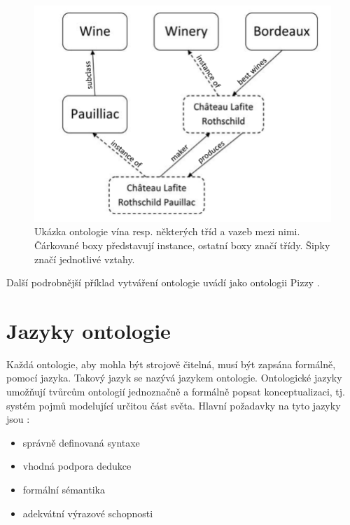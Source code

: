 \begin{figure}[h]
\begin{center}
\includegraphics{figures/wine}
\caption{Ukázka ontologie vína resp. některých tříd a vazeb mezi nimi. Čárkované boxy představují instance, ostatní boxy značí třídy. Šipky značí jednotlivé vztahy.}
\label{img:wine}
\end{center}
\end{figure}

Další podrobnější příklad vytváření ontologie uvádí \cite{owltutorial} jako ontologii Pizzy \cite{pizza}.

\section{Jazyky ontologie}
\label{chapter:ontologyLanguage}

Každá ontologie, aby mohla být strojově čitelná, musí být zapsána formálně, pomocí jazyka. Takový jazyk se nazývá jazykem ontologie. 
Ontologické jazyky umožňují tvůrcům ontologií jednoznačně a formálně popsat konceptualizaci, tj. systém pojmů modelující určitou část světa. 
Hlavní požadavky na tyto jazyky jsou \cite{staab}:

\begin{itemize}
\item správně definovaná syntaxe
\item vhodná podpora dedukce 
\item formální sémantika
\item adekvátní výrazové schopnosti
\end{itemize}

